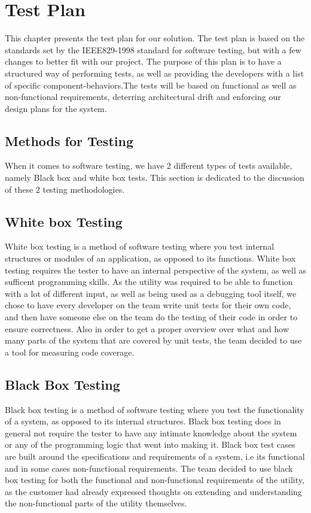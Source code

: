 \chapter{Test Plan}
This chapter presents the test plan for our solution. The test plan is based on
the standards set by the IEEE829-1998 standard for software testing, but with a
few changes to better fit with our project. The purpose of this plan is to have
a structured way of performing tests, as well as providing the developers with
a list of specific component-behaviors.The tests will be based on functional as
well as non-functional requirements, deterring architectural drift and
enforcing our design plans for the system.


\section{Methods for Testing}
When it comes to software testing, we have 2 different types of tests available, namely Black box and white box tests. This section is dedicated to the discussion of these 2 testing methodologies.


\section{White box Testing}
White box testing is a method of software testing where you test internal structures or modules of an application, as opposed to its functions. White box testing requires the tester to have an internal perspective of the system, as well as sufficent programming skills. As the \gls{utility} was required to be able to function with a lot of different input, as well as being used as a debugging tool itself, we chose to have every developer on the team write unit tests for their own code, and then have someone else on the team do the testing of their code in order to ensure correctness. Also in order to get a proper overview over what and how many parts of the system that are covered by unit tests, the team decided to use a tool for measuring code coverage.


\section{Black Box Testing}
Black box testing is a method of software testing where you test the functionality of a system, as opposed to its internal structures. Black box testing does in general not require the tester to have any intimate knowledge about the system or any of the programming logic that went into making it. Black box test cases are built around the specifications and requirements of a system, i.e its functional and in some cases non-functional requirements. The team decided to use black box testing for both the functional and non-functional requirements of the \gls{utility}, as the customer had already expressed thoughts on extending and understanding the non-functional parts of the \gls{utility} themselves. 


